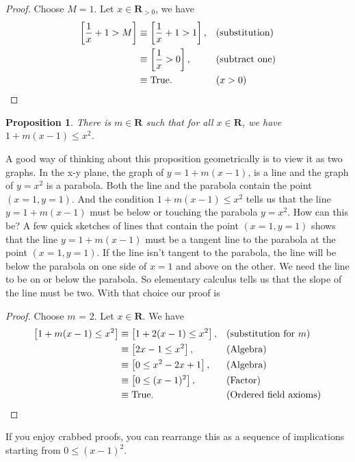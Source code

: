 \documentclass[12pt,fleqn]{article}
\newcommand{\reals}{\mathbf{R}}
\newcommand{\true}{\mathrm{True}}
\newenvironment{myproof}
  {\begin{shaded}\begin{proof}}
  {\end{proof}\end{shaded}}
\newtheorem{prop}{Proposition}
\begin{document}
    \begin{myproof} Choose $M=1$. Let $x  \in \reals_{>0}$, we have
    \begin{align*}
      \left [ \frac{1}{x} + 1 > M \right] &\equiv    \left [ \frac{1}{x} + 1 > 1 \right], &&(\text{substitution}) \\
                                                               &\equiv    \left [ \frac{1}{x}  > 0 \right], &&(\text{subtract one}) \\
                                                               &\equiv \true.    &&  (x > 0) \qedhere
  \end{align*} 
    
    
    \end{myproof}



        \begin{prop}
      There is $m \in \reals$ such that for all $x \in \reals$, we 
     have $1 + m(x-1) \leq x^2$. 
     \end{prop}
     
      A good way of thinking about this proposition geometrically is to view it as two graphs. In the x-y plane, the graph of  $y = 1 + m(x-1)$, is a line  and the
      graph of $y = x^2$  is a parabola.   Both the line  and the parabola contain the point $(x=1,y=1)$. And the 
      condition $1 + m(x-1) \leq x^2$ tells
      us that the line $y = 1 + m(x-1)$ must be below or touching the parabola $y=x^2$.  How can this be? A few quick sketches of lines that
      contain the point $(x=1,y=1)$  shows that the line $y = 1 + m(x-1)$ must be a tangent line to the parabola at the point $(x=1,y=1)$.  If 
      the line isn't tangent to the parabola, the line will be below the parabola on one side of $x=1$ and above on the other.   We need the
      line to be on or below the parabola.  So   elementary calculus tells us that the slope of the line must be two. With that choice
      our proof is      
       \begin{myproof} Choose $m$ = 2. Let $x\in \reals$. We have
       \begin{align*}
         \left[1 + m(x-1) \leq x^2  \right] &\equiv \left[1+2(x-1) \leq  x^2 \right], && \text{(substitution for $m$)} \\
                                      &\equiv \left[2x-1 \leq x^2 \right], 
                                       &&\text{(Algebra)} \\
                                    &\equiv \left[0 \leq x^2 -2x+1 \right], 
                                       &&\text{(Algebra)} \\
                                    &\equiv \left[0 \leq (x-1)^2 \right], 
                                       &&\text{(Factor)} \\
                                      &\equiv \true. &&\text{(Ordered field axioms)} \qedhere
       \end{align*}
       \end{myproof}
       \noindent If you enjoy crabbed proofs, you can rearrange this as a sequence of implications starting from $0 \leq (x-1)^2$. 
   
\end{document}
